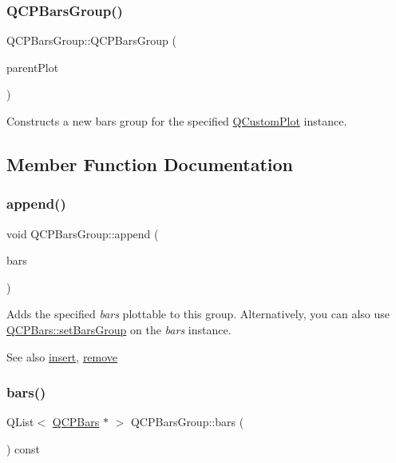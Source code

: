 \subsubsection{\texorpdfstring{Q\+C\+P\+Bars\+Group()}{QCPBarsGroup()}}
{\footnotesize\ttfamily Q\+C\+P\+Bars\+Group\+::\+Q\+C\+P\+Bars\+Group (\begin{DoxyParamCaption}\item[{\hyperlink{class_q_custom_plot}{Q\+Custom\+Plot} $\ast$}]{parent\+Plot }\end{DoxyParamCaption})}

Constructs a new bars group for the specified \hyperlink{class_q_custom_plot}{Q\+Custom\+Plot} instance. 

\subsection{Member Function Documentation}
\hypertarget{class_q_c_p_bars_group_a809ed63cc4ff7cd5b0b8c96b470163d3}{}\label{class_q_c_p_bars_group_a809ed63cc4ff7cd5b0b8c96b470163d3} 
\subsubsection{\texorpdfstring{append()}{append()}}
{\footnotesize\ttfamily void Q\+C\+P\+Bars\+Group\+::append (\begin{DoxyParamCaption}\item[{\hyperlink{class_q_c_p_bars}{Q\+C\+P\+Bars} $\ast$}]{bars }\end{DoxyParamCaption})}

Adds the specified {\itshape bars} plottable to this group. Alternatively, you can also use \hyperlink{class_q_c_p_bars_aedd1709061f0b307c47ddb45e172ef9a}{Q\+C\+P\+Bars\+::set\+Bars\+Group} on the {\itshape bars} instance.

\begin{DoxySeeAlso}{See also}
\hyperlink{class_q_c_p_bars_group_a309a5f7233db189f3ea9c2d04ece6c13}{insert}, \hyperlink{class_q_c_p_bars_group_a215e28a5944f1159013a0e19169220e7}{remove} 
\end{DoxySeeAlso}
\hypertarget{class_q_c_p_bars_group_a6e4f4e86abbec6a9342f204ef82abef8}{}\label{class_q_c_p_bars_group_a6e4f4e86abbec6a9342f204ef82abef8} 
\subsubsection{\texorpdfstring{bars()}{bars()}\hspace{0.1cm}{\footnotesize\ttfamily [1/2]}}
{\footnotesize\ttfamily Q\+List$<$ \hyperlink{class_q_c_p_bars}{Q\+C\+P\+Bars} $\ast$ $>$ Q\+C\+P\+Bars\+Group\+::bars (\begin{DoxyParamCaption}{ }\end{DoxyParamCaption}) const\hspace{0.3cm}{\ttfamily [inline]}}


